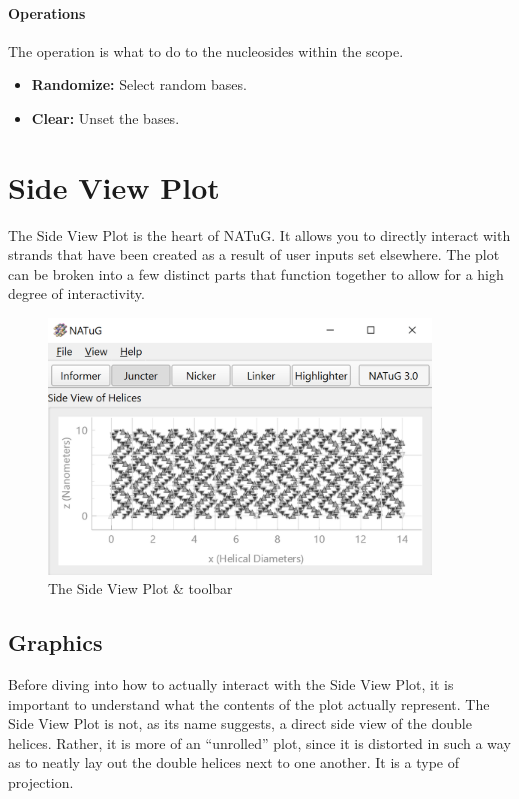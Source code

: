 \documentclass[titlepage]{article}
\begin{document}
\paragraph{Operations}
The operation is what to do to the nucleosides within the scope.

\begin{itemize}
	\item \textbf{Randomize:} Select random bases.
	\item \textbf{Clear:} Unset the bases.
\end{itemize}

\section{Side View Plot}
The Side View Plot is the heart of NATuG. It allows you to directly interact with strands that have been created as a result of user inputs set elsewhere. The plot can be broken into a few distinct parts that function together to allow for a high degree of interactivity. 

\begin{figure}[h] \label{fig:short-side-view-overview}
	\centering
	\caption{The Side View Plot \& toolbar}
	\includegraphics[width=4in]{short-side-view-overview.png}
\end{figure}

\subsection{Graphics}
Before diving into how to actually interact with the Side View Plot, it is important to understand what the contents of the plot actually represent. The Side View Plot is not, as its name suggests, a direct side view of the double helices. Rather, it is more of an ``unrolled'' plot, since it is distorted in such a way as to neatly lay out the double helices next to one another. It is a type of projection.
\end{document}
